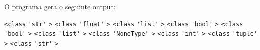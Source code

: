 \documentclass[12pt,varwidth=16cm,border=1pt]{standalone}
\begin{document}
O programa gera o seguinte output:

\verb+<class+ \verb+'str'+ \verb+>+ \newline
\verb+<class+ \verb+'float'+ \verb+>+ \newline
\verb+<class+ \verb+'list'+ \verb+>+ \newline
\verb+<class+ \verb+'bool'+ \verb+>+ \newline
\verb+<class+ \verb+'bool'+ \verb+>+ \newline
\verb+<class+ \verb+'list'+ \verb+>+ \newline
\verb+<class+ \verb+'NoneType'+ \verb+>+ \newline
\verb+<class+ \verb+'int'+ \verb+>+ \newline
\verb+<class+ \verb+'tuple'+ \verb+>+ \newline
\verb+<class+ \verb+'str'+ \verb+>+
\end{document}
